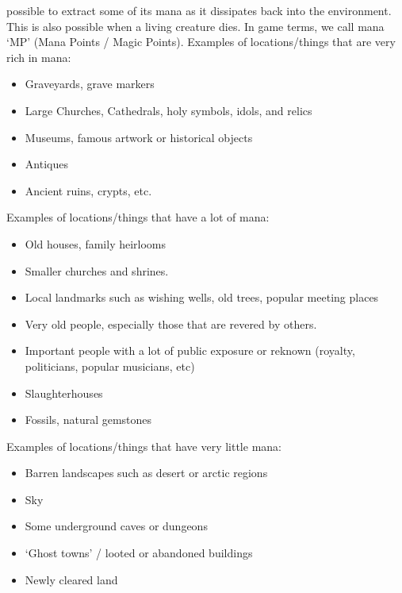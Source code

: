 \documentclass[twoside]{book}
\begin{document}
             possible to extract some of its mana as it dissipates back
             into the environment. This is also possible when a living
             creature dies. In game terms, we call mana `MP'
             (Mana Points / Magic Points).   Examples of locations/things that are very rich in
             mana: 
\begin{itemize}
      
  \item   Graveyards, grave markers 
  \item   Large Churches, Cathedrals, holy symbols, idols,
               and relics 
  \item   Museums, famous artwork or historical objects
               
  \item   Antiques 
  \item   Ancient ruins, crypts, etc. 
\end{itemize}
    Examples of locations/things that have a lot of mana:
             
\begin{itemize}
      
  \item   Old houses, family heirlooms 
  \item   Smaller churches and shrines. 
  \item   Local landmarks such as wishing wells, old trees,
               popular meeting places 
  \item   Very old people, especially those that are revered
               by others. 
  \item   Important people with a lot of public exposure or
               reknown (royalty, politicians, popular musicians, etc)
               
  \item   Slaughterhouses 
  \item   Fossils, natural gemstones 
\end{itemize}
    Examples of locations/things that have very little
             mana: 
\begin{itemize}
      
  \item   Barren landscapes such as desert or arctic regions
               
  \item   Sky 
  \item   Some underground caves or dungeons 
  \item   `Ghost towns' / looted or abandoned
               buildings 
  \item   Newly cleared land 
\end{itemize}
  
\end{document}
